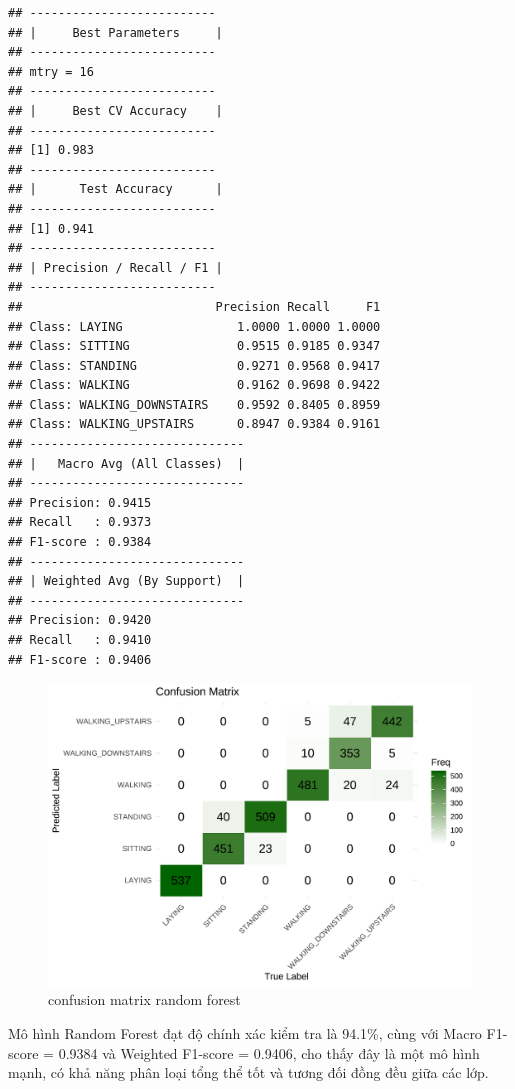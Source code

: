 \documentclass[
]{article}
\begin{document}
\begin{verbatim}
## --------------------------
## |     Best Parameters     |
## --------------------------
## mtry = 16
## --------------------------
## |     Best CV Accuracy    |
## --------------------------
## [1] 0.983
## --------------------------
## |      Test Accuracy      |
## --------------------------
## [1] 0.941
## --------------------------
## | Precision / Recall / F1 |
## --------------------------
##                           Precision Recall     F1
## Class: LAYING                1.0000 1.0000 1.0000
## Class: SITTING               0.9515 0.9185 0.9347
## Class: STANDING              0.9271 0.9568 0.9417
## Class: WALKING               0.9162 0.9698 0.9422
## Class: WALKING_DOWNSTAIRS    0.9592 0.8405 0.8959
## Class: WALKING_UPSTAIRS      0.8947 0.9384 0.9161
## ------------------------------
## |   Macro Avg (All Classes)  |
## ------------------------------
## Precision: 0.9415
## Recall   : 0.9373
## F1-score : 0.9384
## ------------------------------
## | Weighted Avg (By Support)  |
## ------------------------------
## Precision: 0.9420
## Recall   : 0.9410
## F1-score : 0.9406
\end{verbatim}

\begin{figure}
\centering
\includegraphics{report_files/figure-latex/unnamed-chunk-26-1.pdf}
\caption{confusion matrix random forest}
\end{figure}

Mô hình Random Forest đạt độ chính xác kiểm tra là 94.1\%, cùng với
Macro F1-score = 0.9384 và Weighted F1-score = 0.9406, cho thấy đây là
một mô hình mạnh, có khả năng phân loại tổng thể tốt và tương đối đồng
đều giữa các lớp.
\end{document}
